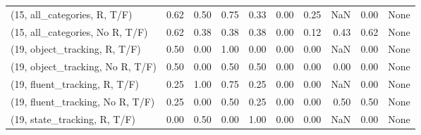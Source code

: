 \begin{table*}[h!]
\begin{adjustbox}{width=2\columnwidth,center}
\begin{tabular}{lrrr|rrr|rrr}
(15, all\_categories, R, T/F)          &                      0.62 &                  0.50 &                      0.75 &                          0.33 &                      0.00 &                          0.25 &                                    NaN &                               0.00 &                                  None \\
(15, all\_categories, No R, T/F)       &                      0.62 &                  0.38 &                      0.38 &                          0.38 &                      0.00 &                          0.12 &                                   0.43 &                               0.62 &                                  None \\



\midrule
(19, object\_tracking, R, T/F)         &                      0.50 &                  0.00 &                      1.00 &                          0.00 &                      0.00 &                          0.00 &                                    NaN &                               0.00 &                                  None \\
(19, object\_tracking, No R, T/F)      &                      0.50 &                  0.00 &                      0.50 &                          0.50 &                      0.00 &                          0.00 &                                   0.00 &                               0.00 &                                  None \\
(19, fluent\_tracking, R, T/F)         &                      0.25 &                  1.00 &                      0.75 &                          0.25 &                      0.00 &                          0.00 &                                    NaN &                               0.00 &                                  None \\
(19, fluent\_tracking, No R, T/F)      &                      0.25 &                  0.00 &                      0.50 &                          0.25 &                      0.00 &                          0.00 &                                   0.50 &                               0.50 &                                  None \\
(19, state\_tracking, R, T/F)          &                      0.00 &                  0.50 &                      0.00 &                          1.00 &                      0.00 &                          0.00 &                                    NaN &                               0.00 &                                  None \\

\end{tabular}
\end{adjustbox}
\end{table*}
